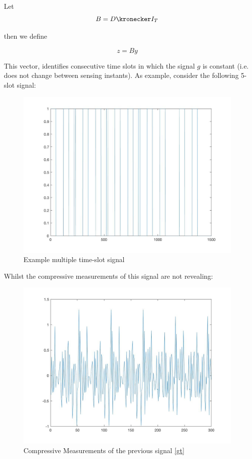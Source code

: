 \begin{definition}
Let
\begin{equation}
B = D \kronecker I_T
\end{equation}

then we define 

\begin{equation}
z = By
\end{equation}
\label{period vector}

This vector, identifies consecutive time slots in which the signal \(g\) is constant (i.e. does not change between sensing instants). As example, consider the following 5-slot signal:

\begin{figure}[h]
\centering
\includegraphics[height = 7.3 cm]{gt.jpg}
\caption{Example multiple time-slot signal}
\label{fig:gt}
\end{figure}

Whilst the compressive measurements of this signal are not revealing:

\begin{figure}[h]
\centering
\includegraphics[height = 7.3 cm]{gt-compressed.jpg}
\caption{Compressive Measurements of the previous signal \ref{gt}}
\label{fig:ygt}
\end{figure}


\end{definition}

